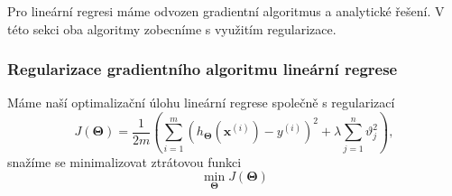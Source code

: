 \par{Pro lineární regresi máme odvozen gradientní algoritmus a analytické řešení. V této sekci oba algoritmy zobecníme s využitím regularizace.}


\subsubsection*{Regularizace gradientního algoritmu lineární regrese}
\par{Máme naší optimalizační úlohu lineární regrese společně s regularizací
\begin{equation}
	J \left( \bm{\Theta} \right) = \frac{1}{2m} \left( \sum_{i = 1}^{m} \left( h_{\bm{\Theta}} \left( \bm{x}^{\left( i \right)} \right) - y^{\left( i \right)} \right)^2 + \lambda \sum_{j = 1}^{n} \vartheta_j^2 \right),
\end{equation}
snažíme se minimalizovat ztrátovou funkci 
\begin{equation}
	\min_{\bm{\Theta}} J \left( \bm{\Theta} \right)
\end{equation}}

